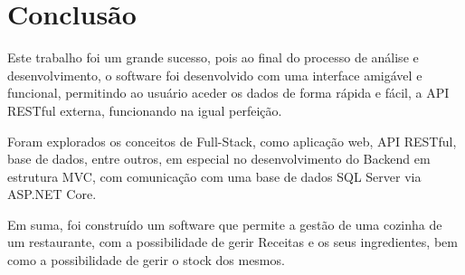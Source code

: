 \chapter{Conclusão}

Este trabalho foi um grande sucesso, pois ao final do processo de análise e desenvolvimento, o software foi desenvolvido com uma interface amigável e funcional, permitindo ao usuário aceder os dados de forma rápida e fácil, a API RESTful externa, funcionando na igual perfeição. 

Foram explorados os conceitos de Full-Stack, como aplicação web, API RESTful, base de dados, entre outros, em especial no desenvolvimento do Backend em estrutura MVC, com comunicação com uma base de dados SQL Server via ASP.NET Core.

Em suma, foi construído um software que permite a gestão de uma cozinha de um restaurante, com a possibilidade de gerir Receitas e os seus ingredientes, bem como a possibilidade de gerir o stock dos mesmos.